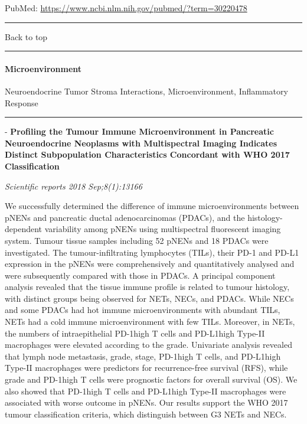 \documentclass[]{article}
\let\oldparagraph\paragraph
\renewcommand{\paragraph}[1]{\oldparagraph{#1}\mbox{}}
\begin{document}
PubMed: \url{https://www.ncbi.nlm.nih.gov/pubmed/?term=30220478}

{}

{}

\begin{center}\rule{0.5\linewidth}{\linethickness}\end{center}

Back to top

\begin{center}\rule{0.5\linewidth}{\linethickness}\end{center}

\pagebreak

\hypertarget{microenvironment-1}{%
\paragraph{Microenvironment}\label{microenvironment-1}}

Neuroendocrine Tumor Stroma Interactions, Microenvironment, Inflammatory
Response

\begin{center}\rule{0.5\linewidth}{\linethickness}\end{center}

 - \textbf{Profiling the Tumour Immune Microenvironment in Pancreatic
Neuroendocrine Neoplasms with Multispectral Imaging Indicates Distinct
Subpopulation Characteristics Concordant with WHO 2017 Classification}

\emph{Scientific reports 2018 Sep;8(1):13166}

We successfully determined the difference of immune microenvironments
between pNENs and pancreatic ductal adenocarcinomas (PDACs), and the
histology-dependent variability among pNENs using multispectral
fluorescent imaging system. Tumour tissue samples including 52 pNENs and
18 PDACs were investigated. The tumour-infiltrating lymphocytes (TILs),
their PD-1 and PD-L1 expression in the pNENs were comprehensively and
quantitatively analysed and were subsequently compared with those in
PDACs. A principal component analysis revealed that the tissue immune
profile is related to tumour histology, with distinct groups being
observed for NETs, NECs, and PDACs. While NECs and some PDACs had hot
immune microenvironments with abundant TILs, NETs had a cold immune
microenvironment with few TILs. Moreover, in NETs, the numbers of
intraepithelial PD-1high T cells and PD-L1high Type-II macrophages were
elevated according to the grade. Univariate analysis revealed that lymph
node metastasis, grade, stage, PD-1high T cells, and PD-L1high Type-II
macrophages were predictors for recurrence-free survival (RFS), while
grade and PD-1high T cells were prognostic factors for overall survival
(OS). We also showed that PD-1high T cells and PD-L1high Type-II
macrophages were associated with worse outcome in pNENs. Our results
support the WHO 2017 tumour classification criteria, which distinguish
between G3 NETs and NECs.
\end{document}
